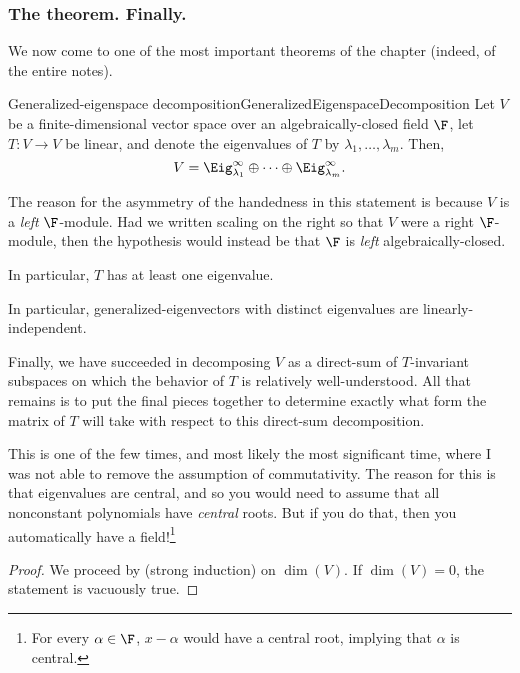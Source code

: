 \subsubsection{The theorem.  Finally.}

We now come to one of the most important theorems of the chapter (indeed, of the entire notes).
\begin{thm}{Generalized-eigenspace decomposition\hfill}{GeneralizedEigenspaceDecomposition}
	Let $V$ be a finite-dimensional vector space over an algebraically-closed field $\F$, let $T\colon V\rightarrow V$ be linear, and denote the eigenvalues of $T$ by $\lambda _1,\ldots ,\lambda _m$.  Then,
	\begin{equation}
	V=\Eig _{\lambda _1}^{\infty}\oplus \cdots \oplus \Eig _{\lambda _m}^{\infty}.
	\end{equation}
	\begin{rmk}
		The reason for the asymmetry of the handedness in this statement is because $V$ is a \emph{left} $\F$-module.  Had we written scaling on the right so that $V$ were a right $\F$-module, then the hypothesis would instead be that $\F$ is \emph{left} algebraically-closed.
	\end{rmk}
	\begin{rmk}
		In particular, $T$ has at least one eigenvalue.
	\end{rmk}
	\begin{rmk}
		In particular, generalized-eigenvectors with distinct eigenvalues are linearly-independent.
	\end{rmk}
	\begin{rmk}
		Finally, we have succeeded in decomposing $V$ as a direct-sum of $T$-invariant subspaces on which the behavior of $T$ is relatively well-understood.  All that remains is to put the final pieces together to determine exactly what form the matrix of $T$ will take with respect to this direct-sum decomposition.
	\end{rmk}
	\begin{rmk}
		This is one of the few times, and most likely the most significant time, where I was not able to remove the assumption of commutativity.  The reason for this is that eigenvalues are central, and so you would need to assume that all nonconstant polynomials have \emph{central} roots.  But if you do that, then you automatically have a field!\footnote{For every $\alpha \in \F$, $x-\alpha$ would have a central root, implying that $\alpha$ is central.}
	\end{rmk}
	\begin{proof}
		We proceed by (strong induction) on $\dim (V)$.  If $\dim (V)=0$, the statement is vacuously true.
		

\end{proof}
\end{thm}
